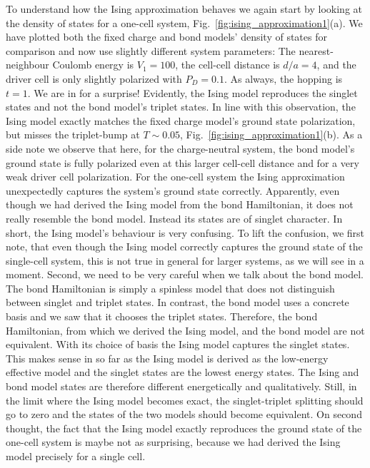 To understand how the Ising approximation behaves we again start by looking at
the density of states for a one-cell system,
Fig.~\ref{fig:ising_approximation1}(a). We have plotted both the fixed charge
and bond models' density of states for comparison and now use slightly different
system parameters: The nearest-neighbour Coulomb energy is $V_1 = 100$, the
cell-cell distance is $d/a = 4$, and the driver cell is only slightly polarized
with $P_D = 0.1$. As always, the hopping is $t=1$. We are in for a surprise!
Evidently, the Ising model reproduces the singlet states and not the bond
model's triplet states. In line with this observation, the Ising model exactly
matches the fixed charge model's ground state polarization, but misses the
triplet-bump at $T \sim 0.05$, Fig.~\ref{fig:ising_approximation1}(b). As a side
note we observe that here, for the charge-neutral system, the bond model's
ground state is fully polarized even at this larger cell-cell distance and for a
very weak driver cell polarization. For the one-cell system the Ising
approximation unexpectedly captures the system's ground state correctly.
Apparently, even though we had derived the Ising model from the bond
Hamiltonian, it does not really resemble the bond model. Instead its states are
of singlet character. In short, the Ising model's behaviour is very confusing.
To lift the confusion, we first note, that even though the Ising model correctly
captures the ground state of the single-cell system, this is not true in
general for larger systems, as we will see in a moment. Second, we need to be
very careful when we talk about the bond model. The bond Hamiltonian is simply a
spinless model that does not distinguish between singlet and triplet states. In
contrast, the bond model uses a concrete basis and we saw that it chooses the
triplet states. Therefore, the bond Hamiltonian, from which we derived the Ising
model, and the bond model are not equivalent. With its choice of basis the Ising
model captures the singlet states. This makes sense in so far as the Ising model
is derived as the low-energy effective model and the singlet states are the
lowest energy states. The Ising and bond model states are therefore different
energetically and qualitatively. Still, in the limit where the Ising model
becomes exact, the singlet-triplet splitting should go to zero and the states of
the two models should become equivalent. On second thought, the fact that the
Ising model exactly reproduces the ground state of the one-cell system is maybe
not as surprising, because we had derived the Ising model precisely for a single
cell.

